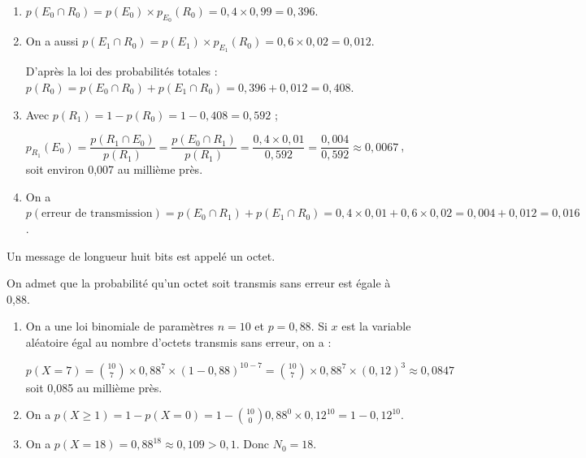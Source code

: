 \documentclass[10pt]{article}
\providecommand{\np}[2][]{{#2~#1}}
\begin{document}
\begin{enumerate}
\item 
$p\left(E_0 \cap R_0\right) = p\left(E_0 \right) \times p_{E_0}\left(R_0 \right) = 0,4 \times 0,99 = 0,396$.






\item 
On a aussi $p\left(E_1 \cap R_0\right) = p\left(E_1 \right) \times p_{E_1}\left(R_0 \right) = 0,6 \times 0,02 = 0,012$.

 D'après la loi des probabilités totales : $p\left(R_0\right) = p\left(E_0 \cap R_0\right) + p\left(E_1 \cap R_0\right) = 0,396 + 0,012 = 0,408$.





\item 

Avec $p\left(R_1 \right) = 1 - p\left(R_0\right) = 1 - 0,408 = 0,592$ ;

$p_{R_1}\left(E_0\right) = \dfrac{p\left(R_1 \cap E_0 \right)}{p\left(R_1\right)} = \dfrac{p\left(E_0 \cap R_1 \right)}{p\left(R_1\right)} = \dfrac{0,4 \times 0,01}{0,592} = \dfrac{0,004}{0,592} \approx \np{0,0067}$, soit environ 0,007 au millième près.





\item 





On a $p(\text{erreur de transmission}) = p\left(E_0 \cap R_1\right) + p\left(E_1 \cap R_0\right) = 0,4 \times 0,01 + 0,6 \times 0,02 = 0,004 + 0,012 = 0,016$.
\end{enumerate}

Un message de longueur huit bits est appelé un octet.

On admet que la probabilité qu'un octet soit transmis sans erreur est égale à 0,88.

\begin{enumerate}[resume]
\item 








On a une loi binomiale de paramètres $n = 10$ et $p = 0,88$. Si $x$ est la variable aléatoire égal au nombre d'octets transmis sans erreur, on a :

$p(X = 7) = \binom{10}{7}\times 0,88^7 \times (1 - 0,88)^{10-7} = \binom{10}{7}\times 0,88^7 \times (0,12)^{3} \approx \np{0,0847}$ soit 0,085 au millième près.
\item 








On a $p(X \geqslant 1) = 1 - p(X = 0) = 1 - \binom{10}{0}0,88^{0} \times 0,12^{10} = 1 - 0,12^{10}$.
\item 










On a $p(X = 18) = 0,88^{18} \approx 0,109 > 0,1$. Donc $N_0 = 18$.
\end{enumerate}
\end{document}
